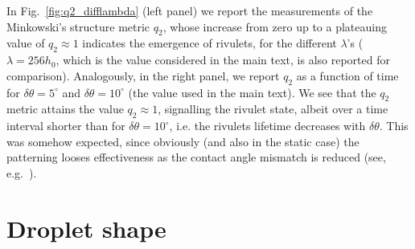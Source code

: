\documentclass[amsmath,amssymb,showpacs,prl,superscriptaddress,notitlepage]{revtex4-1}
\begin{document}
In Fig.~\ref{fig:q2_difflambda} (left panel) we report the measurements of the Minkowski's structure metric $q_2$, whose 
increase from zero up to a plateauing value of $q_2 \approx 1$ indicates the emergence of rivulets, for 
the different $\lambda$'s ($\lambda=256 h_0$, which is the value considered in the main text, is also reported 
for comparison).
Analogously, in the right panel, we report $q_2$ as a function of time for  
$\delta \theta = 5^{\circ}$  and $\delta \theta = 10^{\circ}$ (the value used in the main text). 
We see that the $q_2$ metric attains the value $q_2 \approx 1$, signalling the rivulet state, albeit over 
a time interval shorter than for $\delta \theta = 10^{\circ}$, i.e. the rivulets lifetime decreases with 
$\delta \theta$. This was somehow expected, since obviously (and also in the static case) 
the patterning looses effectiveness as the contact angle mismatch is reduced (see, e.g.~\cite{KonnurPRL2000}).

\newpage

\section{Droplet shape}
\end{document}
